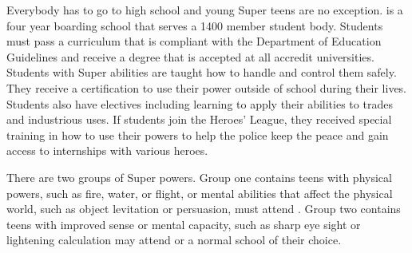 \documentclass[blue]{LRSguildcamp1}
\begin{document}
\name{\bTest{}}

Everybody has to go to high school and young Super teens are no exception. \pSuperSchool{} is a four year boarding school that serves a 1400 member student body. Students must pass a curriculum that is compliant with the Department of Education Guidelines and receive a degree that is accepted at all accredit universities. Students with Super abilities are taught how to handle and control them safely. They receive a certification to use their power outside of school during their lives. Students also have electives including learning to apply their abilities to trades and industrious uses.  If students join the Heroes' League, they received special training in how to use their powers to help the police keep the peace and gain access to internships with various heroes. 

There are two groups of Super powers. Group one contains teens with physical powers, such as fire, water, or flight, or mental abilities that affect the physical world, such as object levitation or persuasion, must attend \pSuperShool{}. Group two contains teens with improved sense or mental capacity, such as sharp eye sight or lightening calculation may attend \pSuperSchool{} or a normal school of their choice.  
\end{document}
